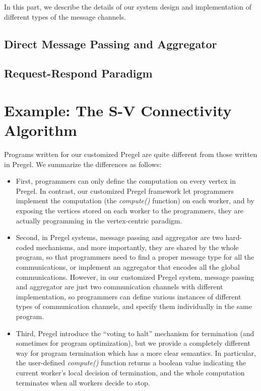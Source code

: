 \documentclass{sokendai_thesis} %
\begin{document}
In this part, we describe the details of our system design and implementation of different types of the message channels.


\subsection{Direct Message Passing and Aggregator}

\subsection{Request-Respond Paradigm}

\section{Example: The S-V Connectivity Algorithm}

Programs written for our customized Pregel are quite different from those written in Pregel.
We summarize the differences as follows:
\begin{itemize}\setlength\itemsep{0em}
\item
 First, programmers can only define the computation on every vertex in Pregel.
In contrast, our customized Pregel framework let programmers implement the computation (the \emph{compute()} function) on each worker, and by exposing the vertices stored on each worker to the programmers, they are actually programming in the vertex-centric paradigm.
\item
 Second, in Pregel systems, message passing and aggregator are two hard-coded mechanisms, and more importantly, they are shared by the whole program, so that programmers need to find a proper message type for all the communications, or implement an aggregator that encodes all the global communications.
 However, in our customized Pregel system, message passing and aggregator are just two communication channels with different implementation, so programmers can define various instances of different types of communication channels, and specify them individually in the same program.
\item
 Third, Pregel introduce the ``voting to halt'' mechanism for termination (and sometimes for program optimization), but we provide a completely different way for program termination which has a more clear semantics.
 In particular, the user-defined \emph{compute()} function returns a boolean value indicating the current worker's local decision of termination, and the whole computation terminates when all workers decide to stop.
\end{itemize}
\end{document}
